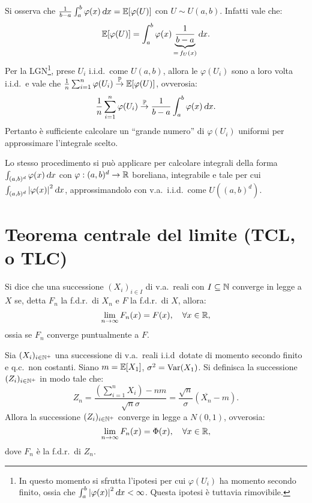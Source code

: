 \begin{multicols*}{2}
Si osserva che $\frac{1}{b-a} \int_a^b \varphi(x) \dx = \EE[\varphi(U)]$ con $U \sim U(a, b)$.
Infatti vale che:
\[
     \EE[\varphi(U)] = \int_a^b \varphi(x) \underbrace{\frac{1}{b-a}}_{=\,f_U(x)} \dx. 
\]
Per la LGN\footnote{In questo momento si sfrutta l'ipotesi per cui $\varphi(U_i)$ ha momento secondo finito,
ossia che $\int_a^b \abs{\varphi(x)}^2 \dx < \infty$. Questa ipotesi è tuttavia rimovibile.},
prese $U_i$ i.i.d.~come $U(a, b)$, allora le $\varphi(U_i)$ sono a loro volta
i.i.d.~e vale che $\frac{1}{n} \sum_{i=1}^n \varphi(U_i) \overset{\mathbb{P}}{\to} \mathbb{E}[\varphi(U)]$, ovverosia:
\[
    \frac{1}{n} \sum_{i=1}^n \varphi(U_i) \toprob \frac{1}{b-a} \int_a^b \varphi(x) \dx.
\]
Pertanto è sufficiente calcolare un ``grande numero'' di $\varphi(U_i)$ uniformi per approssimare
l'integrale scelto. \smallskip

Lo stesso procedimento si può applicare per calcolare integrali della forma $\int_{(a, b)^d} \varphi(x) \dx$ con
$\varphi : (a, b)^d \to \mathbb{R}$ boreliana, integrabile e tale per cui $\int_{(a, b)^d} \abs{\varphi(x)}^2 \dx$,
approssimandolo con v.a.~i.i.d.~come $U((a, b)^d)$. \smallskip

\section{Teorema centrale del limite (TCL, o TLC)}

\begin{definition}
    Si dice che una successione $(X_i)_{i \in I}$ di v.a.~reali con $I \subseteq \mathbb{N}$ converge in legge
    a $X$ se, detta $F_n$ la f.d.r.~di $X_n$ e $F$ la f.d.r.~di $X$, allora:
    \[
        \lim_{n \to \infty} F_n(x) = F(x), \quad \forall x \in \mathbb{R},
    \]
    ossia se $F_n$ converge puntualmente a $F$.
\end{definition}

\begin{theorem}
    Sia $(X_i)_{i \in \mathbb{N}^+}$ una successione di v.a.~reali i.i.d~dotate di momento
    secondo finito e q.c.~non costanti. Siano $m = \mathbb{E}[X_1]$, $\sigma^2 = \operatorname{Var}(X_1)$. Si definisca
    la successione $(Z_i)_{i \in \mathbb{N}^+}$ in modo tale che:
    \[
        Z_n = \frac{\left(\sum_{i=1}^n X_i\right)-nm}{\sqrt{n} \sigma} = \frac{\sqrt{n}}{\sigma} (\overline{X_n} - m).
    \]
    Allora la successione $(Z_i)_{i \in \mathbb{N}^+}$ converge in legge a $N(0, 1)$, ovverosia:
    \[
        \lim_{n \to \infty} F_n(x) = \Phi(x), \quad \forall x \in \mathbb{R},
    \]
    dove $F_n$ è la f.d.r.~di $Z_n$.
\end{theorem}


\end{multicols*}

